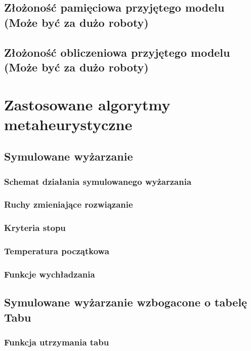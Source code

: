 \section{Złożoność pamięciowa przyjętego modelu (Może być za dużo roboty)}
\section{Złożoność obliczeniowa przyjętego modelu (Może być za dużo roboty)}

\chapter{Zastosowane algorytmy metaheurystyczne}
\section{Symulowane wyżarzanie}
\subsection{Schemat działania symulowanego wyżarzania}
\subsection{Ruchy zmieniające rozwiązanie}
\subsection{Kryteria stopu}
\subsection{Temperatura początkowa}
\subsection{Funkcje wychładzania}
\section{Symulowane wyżarzanie wzbogacone o tabelę Tabu}
\subsection{Funkcja utrzymania tabu}

